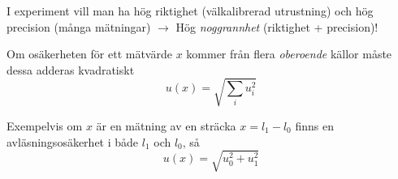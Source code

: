 \documentclass[9pt]{beamer}
\begin{document}
\begin{frame}
        \vfill

        I experiment vill man ha hög riktighet (välkalibrerad utrustning) och
        hög precision (många mätningar) $\rightarrow$ Hög \emph{noggrannhet}
        (riktighet + precision)!
    \end{frame}

    \begin{frame}
        Om osäkerheten för ett mätvärde $x$ kommer från flera \emph{oberoende} källor måste dessa adderas kvadratiskt
        \begin{equation*}
            u(x) = \sqrt{\sum_i u_i^2}
        \end{equation*}

        Exempelvis om $x$ är en mätning av en sträcka $x=l_1 - l_0$ finns en avläsningsosäkerhet i både $l_1$ och $l_0$, så
        \begin{equation*}
            u(x) = \sqrt{u_0^2 + u_1^2}
        \end{equation*}


\end{frame}
\end{document}
